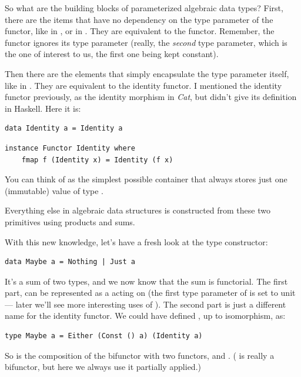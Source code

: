 So what are the building blocks of parameterized algebraic data types?
First, there are the items that have no dependency on the type parameter
of the functor, like  in , or 
in . They are equivalent to the  functor.
Remember, the  functor ignores its type parameter (really,
the \emph{second} type parameter, which is the one of interest to us,
the first one being kept constant).

Then there are the elements that simply encapsulate the type parameter
itself, like  in . They are equivalent to the
identity functor. I mentioned the identity functor previously, as the
identity morphism in \emph{Cat}, but didn't give its definition in
Haskell. Here it is:

\begin{Verbatim}
data Identity a = Identity a
\end{Verbatim}

\begin{Verbatim}
instance Functor Identity where
    fmap f (Identity x) = Identity (f x)
\end{Verbatim}
You can think of  as the simplest possible container
that always stores just one (immutable) value of type .

Everything else in algebraic data structures is constructed from these
two primitives using products and sums.

With this new knowledge, let's have a fresh look at the 
type constructor:

\begin{Verbatim}
data Maybe a = Nothing | Just a
\end{Verbatim}
It's a sum of two types, and we now know that the sum is functorial. The
first part,  can be represented as a 
acting on  (the first type parameter of  is set
to unit --- later we'll see more interesting uses of ).
The second part is just a different name for the identity functor. We
could have defined , up to isomorphism, as:

\begin{Verbatim}
type Maybe a = Either (Const () a) (Identity a)
\end{Verbatim}
So  is the composition of the bifunctor 
with two functors,  and .
( is really a bifunctor, but here we always use it
partially applied.)

